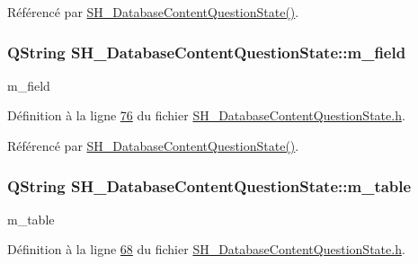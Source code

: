 Référencé par \hyperlink{classSH__DatabaseContentQuestionState_ab26490ea519262a8f9ca72c000bf7313}{S\-H\-\_\-\-Database\-Content\-Question\-State()}.

\hypertarget{classSH__DatabaseContentQuestionState_a32b3f4f2cadbc4837add2556c1a926d4}{
\subsubsection[{m\-\_\-field}]{\setlength{\rightskip}{0pt plus 5cm}Q\-String S\-H\-\_\-\-Database\-Content\-Question\-State\-::m\-\_\-field\hspace{0.3cm}{\ttfamily [private]}}}\label{classSH__DatabaseContentQuestionState_a32b3f4f2cadbc4837add2556c1a926d4}


m\-\_\-field 



Définition à la ligne \hyperlink{SH__DatabaseContentQuestionState_8h_source_l00076}{76} du fichier \hyperlink{SH__DatabaseContentQuestionState_8h_source}{S\-H\-\_\-\-Database\-Content\-Question\-State.\-h}.



Référencé par \hyperlink{classSH__DatabaseContentQuestionState_ab26490ea519262a8f9ca72c000bf7313}{S\-H\-\_\-\-Database\-Content\-Question\-State()}.

\hypertarget{classSH__DatabaseContentQuestionState_a95d8a6ffc051cd9283314a56f7a11296}{
\subsubsection[{m\-\_\-table}]{\setlength{\rightskip}{0pt plus 5cm}Q\-String S\-H\-\_\-\-Database\-Content\-Question\-State\-::m\-\_\-table\hspace{0.3cm}{\ttfamily [private]}}}\label{classSH__DatabaseContentQuestionState_a95d8a6ffc051cd9283314a56f7a11296}


m\-\_\-table 



Définition à la ligne \hyperlink{SH__DatabaseContentQuestionState_8h_source_l00068}{68} du fichier \hyperlink{SH__DatabaseContentQuestionState_8h_source}{S\-H\-\_\-\-Database\-Content\-Question\-State.\-h}.




